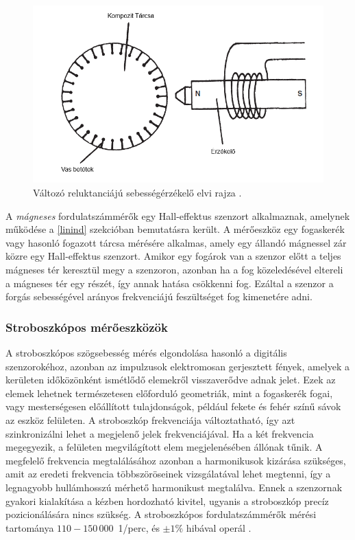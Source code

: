 \begin{figure}
	\centering
	\includegraphics[width=\columnwidth*8/10]{figures/vrt.png}
	\caption{Változó reluktanciájú sebességérzékelő elvi rajza \cite{Morris2016b}.}
	\label{vrt}
\end{figure}

A \textit{mágneses} fordulatszámmérők egy Hall-effektus szenzort alkalmaznak, amelynek működése a \ref{linind} szekcióban bemutatásra került. A mérőeszköz egy fogaskerék vagy hasonló fogazott tárcsa mérésére alkalmas, amely egy állandó mágnessel zár közre egy Hall-effektus szenzort. Amikor egy fogárok van a szenzor előtt a teljes mágneses tér keresztül megy a szenzoron, azonban ha a fog közeledésével eltereli a mágneses tér egy részét, így annak hatása csökkenni fog. Ezáltal a szenzor a forgás sebességével arányos frekvenciájú feszültséget fog kimenetére adni.

\subsubsection{Stroboszkópos mérőeszközök}

A stroboszkópos szögsebesség mérés elgondolása hasonló a digitális szenzorokéhoz, azonban az impulzusok elektromosan gerjesztett fények, amelyek a kerületen időközönként ismétlődő elemekről visszaverődve adnak jelet. Ezek az elemek lehetnek természetesen előforduló geometriák, mint a fogaskerék fogai, vagy mesterségesen előállított tulajdonságok, például fekete és fehér színű sávok az eszköz felületen. A stroboszkóp frekvenciája változtatható, így azt szinkronizálni lehet a megjelenő jelek frekvenciájával. Ha a két frekvencia megegyezik, a felületen megvilágított elem megjelenésében állónak tűnik. A megfelelő frekvencia megtalálásához azonban a harmonikusok kizárása szükséges, amit az eredeti frekvencia többszöröseinek vizsgálatával lehet megtenni, így a legnagyobb hullámhosszú mérhető harmonikust megtalálva. Ennek a szenzornak gyakori kialakítása a kézben hordozható kivitel, ugyanis a stroboszkóp precíz pozicionálására nincs szükség. A stroboszkópos fordulatszámmérők mérési tartománya $110 - 150\,000$~1/perc, és $\pm1\%$ hibával operál \cite{Morris2016b}.

